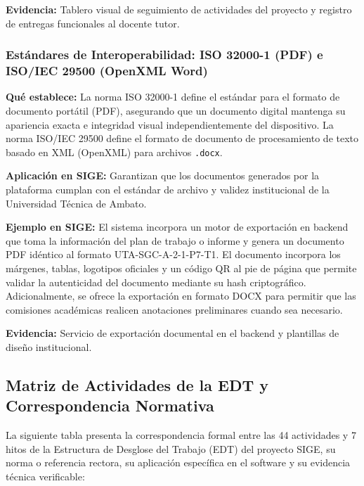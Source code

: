 \documentclass[12pt,a4paper]{article}
\begin{document}
\textbf{Evidencia:}
Tablero visual de seguimiento de actividades del proyecto y registro de entregas funcionales al docente tutor.

\subsubsection{Estándares de Interoperabilidad: ISO 32000-1 (PDF) e ISO/IEC 29500 (OpenXML Word)}

\textbf{Qué establece:}
La norma ISO 32000-1 define el estándar para el formato de documento portátil (PDF), asegurando que un documento digital mantenga su apariencia exacta e integridad visual independientemente del dispositivo. La norma ISO/IEC 29500 define el formato de documento de procesamiento de texto basado en XML (OpenXML) para archivos \texttt{.docx}.

\textbf{Aplicación en SIGE:}
Garantizan que los documentos generados por la plataforma cumplan con el estándar de archivo y validez institucional de la Universidad Técnica de Ambato.

\textbf{Ejemplo en SIGE:}
El sistema incorpora un motor de exportación en backend que toma la información del plan de trabajo o informe y genera un documento PDF idéntico al formato UTA-SGC-A-2-1-P7-T1. El documento incorpora los márgenes, tablas, logotipos oficiales y un código QR al pie de página que permite validar la autenticidad del documento mediante su hash criptográfico. Adicionalmente, se ofrece la exportación en formato DOCX para permitir que las comisiones académicas realicen anotaciones preliminares cuando sea necesario.

\textbf{Evidencia:}
Servicio de exportación documental en el backend y plantillas de diseño institucional.

\subsection{Matriz de Actividades de la EDT y Correspondencia Normativa}

La siguiente tabla presenta la correspondencia formal entre las 44 actividades y 7 hitos de la Estructura de Desglose del Trabajo (EDT) del proyecto SIGE, su norma o referencia rectora, su aplicación específica en el software y su evidencia técnica verificable:
\end{document}
